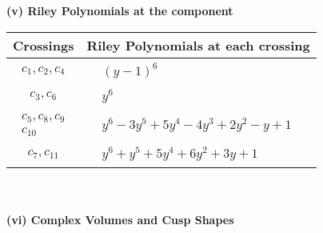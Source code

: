 \documentclass[1p]{elsarticle_modified}
\theoremstyle{definition}
\begin{document}
\newpage\renewcommand{\arraystretch}{1}
\flushleft \textbf{(v) Riley Polynomials at the component}\newline \\
\begin{tabular}{m{50pt}|m{274pt}}
Crossings & \hspace{64pt}Riley Polynomials at each crossing \\
\hline $$\begin{aligned}c_{1},c_{2},c_{4}\end{aligned}$$&$\begin{aligned}
&(y-1)^6
\end{aligned}$\\
\hline $$\begin{aligned}c_{3},c_{6}\end{aligned}$$&$\begin{aligned}
&y^6
\end{aligned}$\\
\hline $$\begin{aligned}c_{5},c_{8},c_{9}\\c_{10}\end{aligned}$$&$\begin{aligned}
&y^6-3 y^5+5 y^4-4 y^3+2 y^2- y+1
\end{aligned}$\\
\hline $$\begin{aligned}c_{7},c_{11}\end{aligned}$$&$\begin{aligned}
&y^6+y^5+5 y^4+6 y^2+3 y+1
\end{aligned}$\\
\hline
\end{tabular}\\~\\
\newpage\flushleft \textbf{(vi) Complex Volumes and Cusp Shapes}
\end{document}
